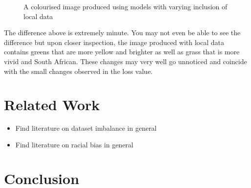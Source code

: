 \documentclass[conference]{IEEEtran}
\begin{document}
\begin{figure}[h!]
    \centering
    \qquad
    \caption{A colourised image produced using models with varying inclusion of local data}%
    \label{fig:inclusion_compare}
\end{figure}

The difference above is extremely minute. You may not even be able to see the difference but upon closer inspection, the image produced with local data contains greens that are more yellow and brighter as well as grass that is more vivid and South African. These changes may very well go unnoticed and coincide with the small changes observed in the loss value.

\section{Related Work}

\begin{itemize}
    \item Find literature on dataset imbalance in general
    \item Find literature on racial bias in general
\end{itemize}

\section{Conclusion}

%
%
%
\end{document}
